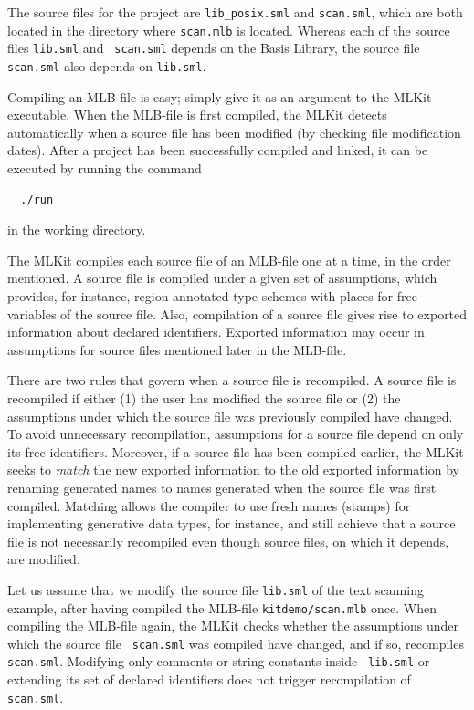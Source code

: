 \documentclass[12pt]{book}
\begin{document}
\noindent
The source files for the project are {\tt lib\_posix.sml} and {\tt scan.sml},
which are both located in the directory where {\tt scan.mlb} is
located. Whereas each of the source files {\tt lib.sml} and {\tt
  scan.sml} depends on the Basis Library, the source file {\tt
  scan.sml} also depends on {\tt lib.sml}.

Compiling an MLB-file is easy; simply give it as an argument to the
MLKit executable. When the MLB-file is first compiled, the MLKit
detects automatically when a source file has been modified (by
checking file modification dates). After a project has been
successfully compiled and linked, it can be executed by running the
command
%
\begin{verbatim}
  ./run
\end{verbatim}
in the working directory.

The MLKit compiles each source file of an MLB-file one at a time, in
the order mentioned. A source file is compiled under a given set of
assumptions, which provides, for instance, region-annotated type
schemes with places for free variables of the source file. Also,
compilation of a source file gives rise to exported information about
declared identifiers. Exported information may occur in assumptions
for source files mentioned later in the MLB-file.

There are two rules that govern when a source file is recompiled.  A
source file is recompiled if either (1) the user has modified the
source file or (2) the assumptions under which the source file was
previously compiled have changed. To avoid unnecessary recompilation,
assumptions for a source file depend on only its free identifiers.
Moreover, if a source file has been compiled earlier, the MLKit seeks to
%
{\em match\/} the new exported information to the old exported
information by renaming generated names to names generated when the
source file was first compiled. Matching allows the compiler to use
fresh names (stamps) for implementing generative data types, for
instance, and still achieve that a source file is not necessarily
%
recompiled even though source files, on which it depends, are
modified.

Let us assume that we modify the source file {\tt lib.sml} of the text
scanning example, after having compiled the MLB-file
\texttt{kitdemo/scan.mlb} once. When compiling the MLB-file again, the
MLKit checks whether the assumptions under which the source file {\tt
  scan.sml} was compiled have changed, and if so, recompiles {\tt
  scan.sml}.  Modifying only comments or string constants inside {\tt
  lib.sml} or extending its set of declared identifiers does not
trigger recompilation of {\tt scan.sml}.
\end{document}
